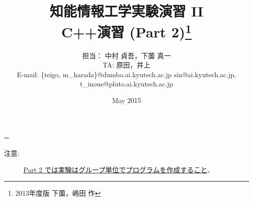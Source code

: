 %
%
\setlength{\topmargin}{-1cm}
\setlength{\oddsidemargin}{0cm}
\setlength{\textwidth}{16cm}
\setlength{\textheight}{24cm}
\renewcommand{\@}[1]{{\bf #1}}

\title{{\normalsize 知能情報工学実験演習 II }\\
\bf C++演習 (Part 2)\footnote{2013年度版 下薗，嶋田 作} }
\author{担当： 中村 貞吾，下薗 真一\\
TA: 原田，井上	\\
E-mail: \footnotesize
{\sf \{teigo, m\_harada\}@dumbo.ai.kyutech.ac.jp}
\footnotesize
{\sf sin@ai.kyutech.ac.jp},\\
\footnotesize
{\sf t\_inoue@pluto.ai.kyutech.ac.jp}}
\date{May 2015}
%
%
\def\linesparpage#1{\baselineskip=\textheight\divide\baselineskip#1}
\newtheorem{exerc}{演習}
\newtheorem{adv}{発展課題}
\setcounter{pntnumber}{0}
\newcommand{\POINT}[2]{
 \medskip
 \refstepcounter{pntnumber}
\noindent
■■■■■ {\sf Point \arabic{pntnumber}:} {\bf #1} \hrulefill ■ \\
{\small #2}

\noindent
■ \hrulefill ■■■■■ \\
 \medskip
}

%
%

\linesparpage{36}
\maketitle

\medskip

\begin{description}
\item[注意:] \underline{Part 2 では実験はグループ単位でプログラムを作成すること}．
\end{description}

